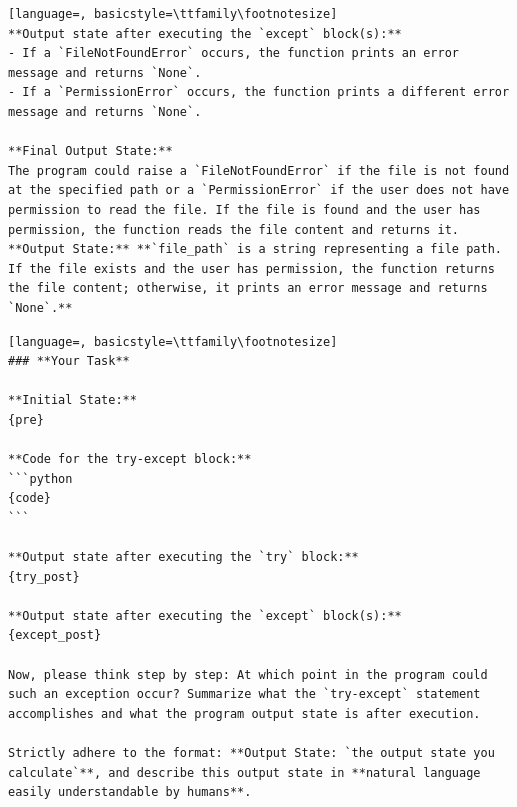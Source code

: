 \documentclass[sigconf]{acmart}
\begin{document}
\begin{tcolorbox}[ colback=gray!10, colframe=black, arc=5pt]
\begin{lstlisting}[language=, basicstyle=\ttfamily\footnotesize]
**Output state after executing the `except` block(s):**
- If a `FileNotFoundError` occurs, the function prints an error message and returns `None`.
- If a `PermissionError` occurs, the function prints a different error message and returns `None`.

**Final Output State:**  
The program could raise a `FileNotFoundError` if the file is not found at the specified path or a `PermissionError` if the user does not have permission to read the file. If the file is found and the user has permission, the function reads the file content and returns it.  
**Output State:** **`file_path` is a string representing a file path. If the file exists and the user has permission, the function returns the file content; otherwise, it prints an error message and returns `None`.**

\end{lstlisting}
\end{tcolorbox}

\begin{tcolorbox}[ colback=gray!10, colframe=black, arc=5pt]
\begin{lstlisting}[language=, basicstyle=\ttfamily\footnotesize]
### **Your Task**

**Initial State:**  
{pre}

**Code for the try-except block:**
```python
{code}
```

**Output state after executing the `try` block:**  
{try_post}

**Output state after executing the `except` block(s):**  
{except_post}

Now, please think step by step: At which point in the program could such an exception occur? Summarize what the `try-except` statement accomplishes and what the program output state is after execution.

Strictly adhere to the format: **Output State: `the output state you calculate`**, and describe this output state in **natural language easily understandable by humans**.

\end{lstlisting}
\end{tcolorbox}
\end{document}
